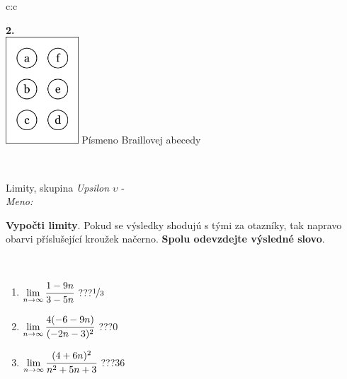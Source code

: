 \documentclass[10pt]{report}
\begin{document}
\begin{tabular}{c:c}
\begin{minipage}[c][104.5mm][t]{0.5\linewidth}
\begin{center}
\begin{minipage}{0.20\linewidth}
\begin{center}
{\Huge\bfseries 2.} \\[2mm]
\includegraphics[height=40mm]{../images/braille.png}
{\small Písmeno Braillovej abecedy}
\end{center}
\end{minipage}
\end{center}
\end{minipage}
\\ \hdashline
\begin{minipage}[c][104.5mm][t]{0.5\linewidth}
\begin{center}
\vspace{7mm}
{\huge Limity, skupina \textit{Upsilon $\upsilon$} -}\\[5mm]
\textit{Meno:}\phantom{xxxxxxxxxxxxxxxxxxxxxxxxxxxxxxxxxxxxxxxxxxxxxxxxxxxxxxxxxxxxxxxxx}\\[5mm]
\begin{minipage}{0.95\linewidth}
\begin{center}
\textbf{Vypočti limity}. Pokud se výsledky shodujú s tými za otazníky, tak napravo\\obarvi příslušející kroužek načerno. \textbf{Spolu odevzdejte výsledné slovo}.
\end{center}
\end{minipage}
\\[1mm]
\begin{minipage}{0.79\linewidth}
\begin{center}
\begin{varwidth}{\linewidth}
\begin{enumerate}
\normalsize
\item $\lim\limits_{n\to\infty}\cfrac{1-9n}{3-5n}$\quad \dotfill\; ???\;\dotfill \quad $\nicefrac{1}{3}$
\item $\lim\limits_{n\to\infty}\cfrac{4(-6-9n)}{(-2n-3)^2}$\quad \dotfill\; ???\;\dotfill \quad $0$
\item $\lim\limits_{n\to\infty}\cfrac{(4+6n)^2}{n^2+5n+3}$\quad \dotfill\; ???\;\dotfill \quad $36$

\end{enumerate}
\end{varwidth}
\end{center}
\end{minipage}
\end{center}
\end{minipage}
\end{tabular}
\end{document}
